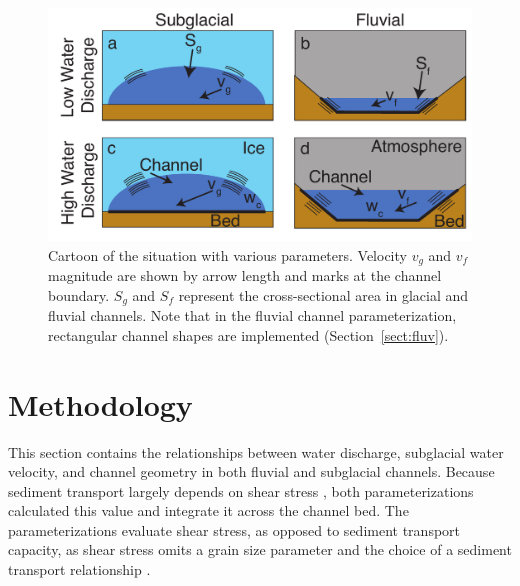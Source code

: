 \documentclass[11pt]{article}
\begin{document}
\begin{spacing}{1}
          \begin{center}
            \begin{figure}[H]
              \includegraphics[width=0.9\linewidth]{Cartoon.pdf}
              \caption{Cartoon of the situation with various parameters. Velocity $v_g$ and $v_f$ magnitude are shown by arrow length and marks at the channel boundary. $S_g$ and $S_f$ represent the cross-sectional area in glacial and fluvial channels.  Note that in the fluvial channel parameterization, rectangular channel shapes are implemented (Section~\ref{sect:fluv}).} 
              \label{fig:cartoon}
            \end{figure}
          \end{center}
          
          \section{Methodology}
          \label{sect:meth}
          This section contains the relationships between water discharge, subglacial water velocity, and channel geometry in both fluvial and subglacial channels.
          Because sediment transport largely depends on shear stress \citep{shields1936}, both parameterizations calculated this value and integrate  it across the channel bed.
          The parameterizations evaluate shear stress, as opposed to sediment transport capacity, as shear stress omits a grain size parameter and the choice of a sediment transport relationship \citep{shields1936}.
          

\end{spacing}
\end{document}
